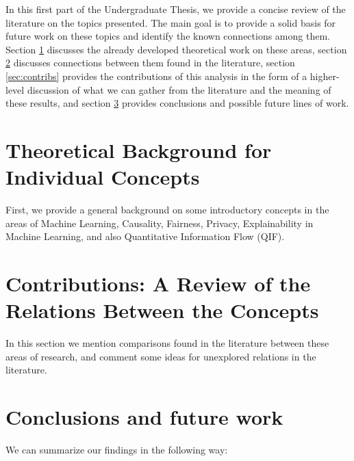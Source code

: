 \documentclass{article}
\begin{document}
In this first part of the Undergraduate Thesis, we provide a concise review of the literature on the topics presented. The main goal is to provide a solid basis for future work on these topics and identify the known connections among them. Section \ref{sec:theoRef1} discusses the already developed theoretical work on these areas, section \ref{sec:theoRef2} discusses connections between them found in the literature, section \ref{sec:contribs} provides the contributions of this analysis in the form of a higher-level discussion of what we can gather from the literature and the meaning of these results, and section \ref{sec:concsFuture} provides conclusions and possible future lines of work. 

\section{Theoretical Background for Individual Concepts}\label{sec:theoRef1}

First, we provide a general background on some introductory concepts in the areas of Machine Learning, Causality, Fairness, Privacy, Explainability in Machine Learning, and also Quantitative Information Flow (QIF).



\section{Contributions: A Review of the Relations Between the Concepts}\label{sec:theoRef2}

In this section we mention comparisons found in the literature between these areas of research, and comment some ideas for unexplored relations in the literature.



\section{Conclusions and future work}\label{sec:concsFuture}

We can summarize our findings in the following way:
\end{document}
